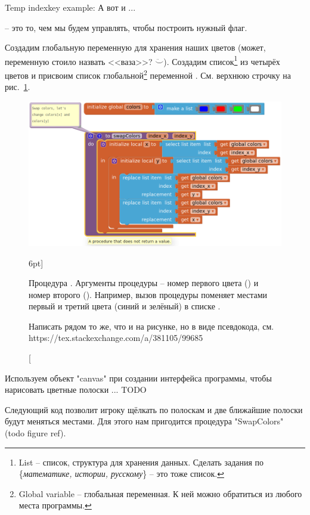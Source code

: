 Temp indexkey example: А вот и ...

 -- это то, чем мы будем управлять, 
чтобы построить нужный флаг. 

Создадим глобальную переменную  для хранения наших цветов 
(может, переменную стоило назвать <<ваза>>? $\ddot\smile$). 
Создадим список\footnote[][-2cm]{List -- 
список, структура для хранения данных. 
Сделать задания по \{\emph{математике, истории, русскому}\} -- это тоже список.
} 
из четырёх цветов и присвоим список глобальной\footnote[][-0.5cm]{Global variable -- 
глобальная переменная. К ней можно обратиться из любого места программы. 
} 
переменной . См. верхнюю строчку на рис.~\ref{fig:block:proc:swap:colors}.

\begin{figure}
  \includegraphics{./graphics/programs/change_flags/proc_swap_colors_2018.png}
    \caption[Процедура .][6pt]{Процедура .
    Аргументы процедуры -- номер первого цвета () 
    и номер второго (). 
    Например, вызов процедуры  поменяет местами первый и 
    третий цвета (синий и зелёный) в списке . 
    
    {\tiny Написать рядом то же, что и на рисунке, но в виде псевдокода, 
    см. https://tex.stackexchange.com/a/381105/99685
    }
    
    }
  \label{fig:block:proc:swap:colors}
\end{figure}

Используем объект "canvas" при создании интерфейса программы, чтобы нарисовать 
цветные полоски ... TODO

Следующий код позволит игроку щёлкать по полоскам 
и две ближайшие полоски будут меняться местами. 
Для этого нам пригодится процедура "SwapColors" (todo figure ref). 

